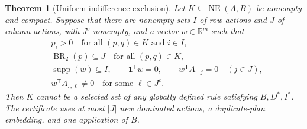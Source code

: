 \documentclass[11pt]{article}
\newcommand{\NE}{\operatorname{NE}}
\newcommand{\BR}{\operatorname{BR}}
\newcommand{\supp}{\operatorname{supp}}
\newcommand{\R}{\mathbb R}
\newcommand{\one}{\mathbf 1}
\newtheorem{theorem}{Theorem}[section]
\theoremstyle{definition}
\theoremstyle{remark}
\begin{document}
\begin{theorem}[Uniform indifference exclusion]\label{thm:certificate}
Let $K\subseteq\NE(A,B)$ be nonempty and compact. Suppose that there are
nonempty sets $I$ of row actions and $J$ of column actions, with $J^c$
nonempty, and a vector $w\in\R^m$ such that
\begin{align}
 &p_i>0\quad\text{for all }(p,q)\in K\text{ and }i\in I,\label{eq:used}\\
 &\BR_2(p)\subseteq J\quad\text{for all }(p,q)\in K,\label{eq:best}\\
 &\supp(w)\subseteq I,\qquad \one^{\mathsf T}w=0,\qquad
     w^{\mathsf T}A_{:,j}=0\quad(j\in J),\label{eq:annihilate}\\
 &w^{\mathsf T}A_{:,\ell}\ne0\quad\text{for some }\ell\in J^c.
 \label{eq:detect}
\end{align}
Then $K$ cannot be a selected set of any globally defined rule satisfying
$B,D^*,I^*$. The certificate uses at most $|J|$ new dominated actions,
a duplicate-plan embedding, and one application of $B$.
\end{theorem}
\end{document}
